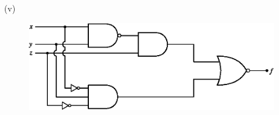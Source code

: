 \begin{enumerate}
\begin{itemize}
\item[(v)]~ 
\begin{figure}[H]
\centering
\includegraphics{chap5/ans5.5.eps}
\end{figure}
\end{itemize}
\end{enumerate}


\label{5end}

